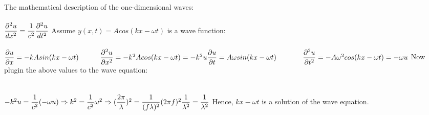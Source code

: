 \documentclass[fleqn]{article}
\begin{document}
\begin{enumerate}
      \textcolor{hwColor}{
        The mathematical description of the one-dimensional waves: \\
        \\
        $
          \dfrac{\partial^2 u}{dx^2}=\dfrac{1}{c^2}\dfrac{\partial^2 u}{dt^2} \\
          \\
        $
        Assume $y(x,t)=Acos(kx-\omega t)$ is a wave function:\\
        \\
        $
          \dfrac{\partial u}{\partial x}=-kAsin(kx- \omega t) ~~~~~~~~~ \dfrac{\partial^2 u}{\partial x^2}=-k^2Acos(kx-\omega t)=-k^2u \\
          \\
          \\
          \dfrac{\partial u}{\partial t}=A \omega sin(kx-\omega t) ~~~~~~~~~~~ \dfrac{\partial^2 u}{\partial t^2}=-A\omega^2 cos(kx- \omega t)=-\omega u \\
          \\
        $
        Now plugin the above values to the wave equation: \\
        \\
        \\
        $
          -k^2u=\dfrac{1}{c^2}(- \omega u) \Rightarrow k^2=\dfrac{1}{c^2}\omega^2 \Rightarrow (\dfrac{2\pi}{\lambda})^2=\dfrac{1}{(f \lambda)^2}(2\pi f)^2 \\
          \\
          \dfrac{1}{\lambda^2}=\dfrac{1}{\lambda^2} \\
          \\
        $
        Hence, $kx-\omega t$ is a solution of the wave equation.
      }

  \end{enumerate}
\end{document}
